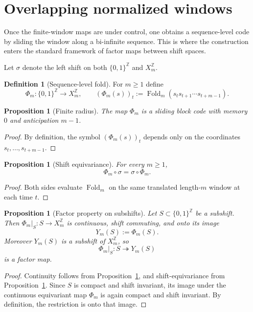 \documentclass[11pt,letterpaper]{article}
\numberwithin{equation}{section}
\theoremstyle{plain}
\newtheorem{proposition}[theorem]{Proposition}
\theoremstyle{definition}
\newtheorem{definition}[theorem]{Definition}
\theoremstyle{remark}
\newcommand{\ZZ}{\mathbb{Z}}
\DeclareMathOperator{\Fold}{Fold}
\begin{document}
\section{Overlapping normalized windows}

Once the finite-window maps are under control, one obtains a sequence-level
code by sliding the window along a bi-infinite sequence.  This is where the
construction enters the standard framework of factor maps between shift spaces.

Let $\sigma$ denote the left shift on both $\{0,1\}^{\ZZ}$ and $X_m^{\ZZ}$.

\begin{definition}[Sequence-level fold]
\label{def:Phi-m}
For $m\ge 1$ define
\[
\Phi_m:\{0,1\}^{\ZZ}\to X_m^{\ZZ},
\qquad
(\Phi_m(s))_t:=\Fold_m(s_t s_{t+1}\cdots s_{t+m-1}).
\]
\end{definition}

\begin{proposition}[Finite radius]
\label{prop:Phi-m-radius}
The map $\Phi_m$ is a sliding block code with memory $0$ and anticipation
$m-1$.
\end{proposition}

\begin{proof}
By definition, the symbol $(\Phi_m(s))_t$ depends only on the coordinates
$s_t,\ldots,s_{t+m-1}$.
\end{proof}

\begin{proposition}[Shift equivariance]
\label{prop:Phi-m-equivariant}
For every $m\ge 1$,
\[
\Phi_m\circ \sigma=\sigma\circ \Phi_m.
\]
\end{proposition}

\begin{proof}
Both sides evaluate $\Fold_m$ on the same translated length-$m$ window at each
time $t$.
\end{proof}

\begin{proposition}[Factor property on subshifts]
\label{prop:Phi-m-factor}
Let $S\subset \{0,1\}^{\ZZ}$ be a subshift.  Then $\Phi_m|_S:S\to X_m^{\ZZ}$ is
continuous, shift commuting, and onto its image
\[
Y_m(S):=\Phi_m(S).
\]
Moreover $Y_m(S)$ is a subshift of $X_m^{\ZZ}$, so
\[
\Phi_m|_S:S\twoheadrightarrow Y_m(S)
\]
is a factor map.
\end{proposition}

\begin{proof}
Continuity follows from Proposition~\ref{prop:Phi-m-radius}, and
shift-equivariance from Proposition~\ref{prop:Phi-m-equivariant}.  Since $S$ is
compact and shift invariant, its image under the continuous equivariant map
$\Phi_m$ is again compact and shift invariant.  By definition, the restriction
is onto that image.
\end{proof}
\end{document}
